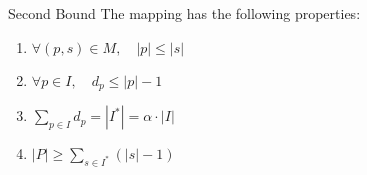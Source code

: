 \begin{frame}{Second Bound}
The mapping has the following properties:
\begin{minipage}{0.48\linewidth}



\end{minipage}
\hfill
\begin{minipage}{0.48\linewidth}

\begin{enumerate}
\pause\item
$\forall (p, s) \in M, \quad |p| \leq |s|$

\pause\item
$\forall p \in I, \quad d_p \leq |p| - 1$

\pause\item
$\sum_{p \in I}{d_p} = |I^*| = \alpha \cdot |I|$

\pause\item
$|P| \geq \sum_{s \in I^*}{(|s| - 1)}$
\end{enumerate}

\end{minipage}
\end{frame}